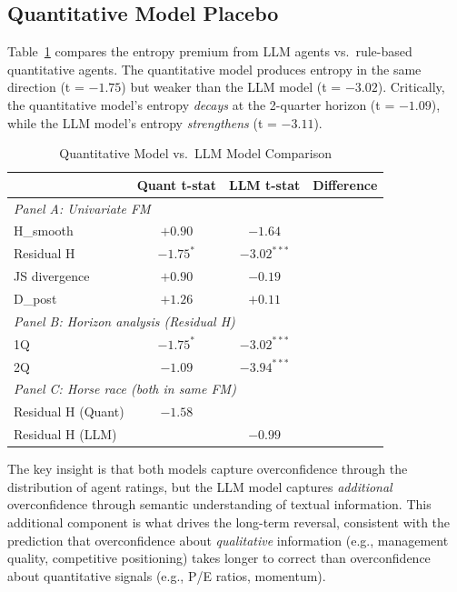 \documentclass[12pt,a4paper]{article}
\begin{document}
\subsection{Quantitative Model Placebo}

Table~\ref{tab:quant} compares the entropy premium from LLM agents vs.\ rule-based quantitative agents. The quantitative model produces entropy in the same direction (t = $-1.75$) but weaker than the LLM model (t = $-3.02$). Critically, the quantitative model's entropy \textit{decays} at the 2-quarter horizon (t = $-1.09$), while the LLM model's entropy \textit{strengthens} (t = $-3.11$).

\begin{table}[H]
\centering
\caption{Quantitative Model vs.\ LLM Model Comparison}
\label{tab:quant}
\small
\begin{tabular}{lccc}
\toprule
 & Quant t-stat & LLM t-stat & Difference \\
\midrule
\multicolumn{4}{l}{\textit{Panel A: Univariate FM}} \\
H\_smooth & $+0.90$ & $-1.64$ & \\
Residual H & $-1.75^{*}$ & $-3.02^{***}$ & \\
JS divergence & $+0.90$ & $-0.19$ & \\
D\_post & $+1.26$ & $+0.11$ & \\
\midrule
\multicolumn{4}{l}{\textit{Panel B: Horizon analysis (Residual H)}} \\
1Q & $-1.75^{*}$ & $-3.02^{***}$ & \\
2Q & $-1.09$ & $-3.94^{***}$ & \\
\midrule
\multicolumn{4}{l}{\textit{Panel C: Horse race (both in same FM)}} \\
Residual H (Quant) & $-1.58$ & & \\
Residual H (LLM) & & $-0.99$ & \\
\bottomrule
\end{tabular}
\end{table}

The key insight is that both models capture overconfidence through the distribution of agent ratings, but the LLM model captures \textit{additional} overconfidence through semantic understanding of textual information. This additional component is what drives the long-term reversal, consistent with the \citet{Daniel1998} prediction that overconfidence about \textit{qualitative} information (e.g., management quality, competitive positioning) takes longer to correct than overconfidence about quantitative signals (e.g., P/E ratios, momentum).
\end{document}
